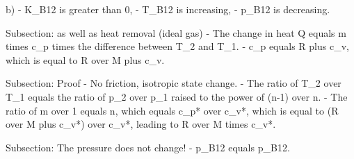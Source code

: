 b) 
- K_B12 is greater than 0,
- T_B12 is increasing,
- p_B12 is decreasing.

Subsection: as well as heat removal (ideal gas)
- The change in heat Q equals m times c_p times the difference between T_2 and T_1.
- c_p equals R plus c_v, which is equal to R over M plus c_v.

Subsection: Proof
- No friction, isotropic state change.
- The ratio of T_2 over T_1 equals the ratio of p_2 over p_1 raised to the power of (n-1) over n.
- The ratio of m over 1 equals n, which equals c_p* over c_v*, which is equal to (R over M plus c_v*) over c_v*, leading to R over M times c_v*.

Subsection: The pressure does not change!
- p_B12 equals p_B12.